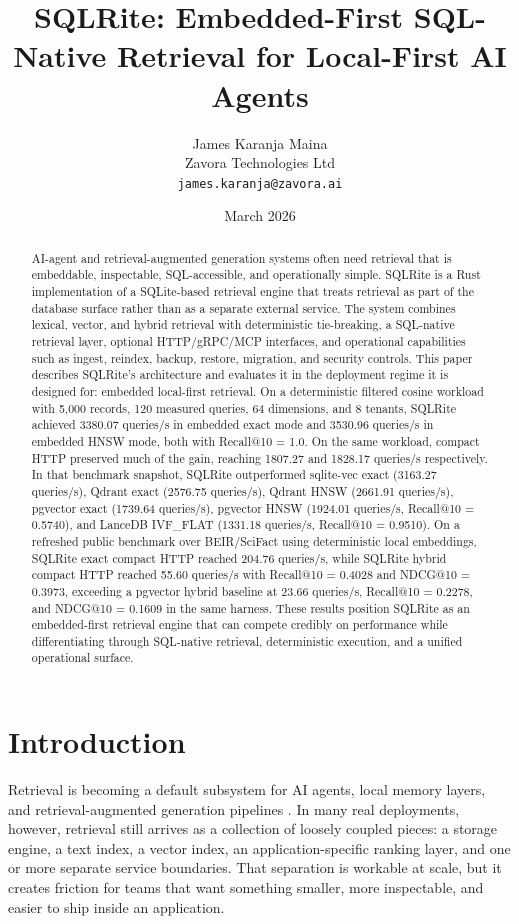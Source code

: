 \documentclass[11pt]{article}
\title{SQLRite: Embedded-First SQL-Native Retrieval for Local-First AI Agents}
\author{James Karanja Maina \\ Zavora Technologies Ltd \\ \texttt{james.karanja@zavora.ai}}
\date{March 2026}
\begin{document}
\maketitle

\begin{abstract}
AI-agent and retrieval-augmented generation systems often need retrieval that is embeddable, inspectable, SQL-accessible, and operationally simple. SQLRite is a Rust implementation of a SQLite-based retrieval engine that treats retrieval as part of the database surface rather than as a separate external service. The system combines lexical, vector, and hybrid retrieval with deterministic tie-breaking, a SQL-native retrieval layer, optional HTTP/gRPC/MCP interfaces, and operational capabilities such as ingest, reindex, backup, restore, migration, and security controls. This paper describes SQLRite's architecture and evaluates it in the deployment regime it is designed for: embedded local-first retrieval. On a deterministic filtered cosine workload with 5,000 records, 120 measured queries, 64 dimensions, and 8 tenants, SQLRite achieved 3380.07 queries/s in embedded exact mode and 3530.96 queries/s in embedded HNSW mode, both with Recall@10 = 1.0. On the same workload, compact HTTP preserved much of the gain, reaching 1807.27 and 1828.17 queries/s respectively. In that benchmark snapshot, SQLRite outperformed sqlite-vec exact (3163.27 queries/s), Qdrant exact (2576.75 queries/s), Qdrant HNSW (2661.91 queries/s), pgvector exact (1739.64 queries/s), pgvector HNSW (1924.01 queries/s, Recall@10 = 0.5740), and LanceDB IVF\_FLAT (1331.18 queries/s, Recall@10 = 0.9510). On a refreshed public benchmark over BEIR/SciFact using deterministic local embeddings, SQLRite exact compact HTTP reached 204.76 queries/s, while SQLRite hybrid compact HTTP reached 55.60 queries/s with Recall@10 = 0.4028 and NDCG@10 = 0.3973, exceeding a pgvector hybrid baseline at 23.66 queries/s, Recall@10 = 0.2278, and NDCG@10 = 0.1609 in the same harness. These results position SQLRite as an embedded-first retrieval engine that can compete credibly on performance while differentiating through SQL-native retrieval, deterministic execution, and a unified operational surface.
\end{abstract}

\section{Introduction}
Retrieval is becoming a default subsystem for AI agents, local memory layers, and retrieval-augmented generation pipelines \citep{lewis2020rag}. In many real deployments, however, retrieval still arrives as a collection of loosely coupled pieces: a storage engine, a text index, a vector index, an application-specific ranking layer, and one or more separate service boundaries. That separation is workable at scale, but it creates friction for teams that want something smaller, more inspectable, and easier to ship inside an application.
\end{document}
